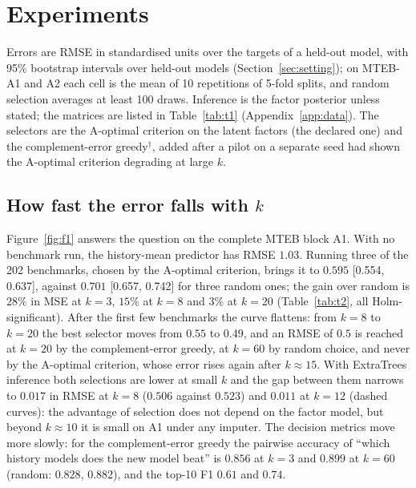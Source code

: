 \section{Experiments}
\label{sec:experiments}
Errors are RMSE in standardised units over the targets of a held-out model, with 95\% bootstrap intervals over held-out models (Section~\ref{sec:setting}); on MTEB-A1 and A2 each cell is the mean of 10 repetitions of 5-fold splits, and random selection averages at least 100 draws.
Inference is the factor posterior unless stated; the matrices are listed in Table~\ref{tab:t1} (Appendix~\ref{app:data}).
The selectors are the A-optimal criterion on the latent factors (the declared one) and the complement-error greedy$^\dagger$, added after a pilot on a separate seed had shown the A-optimal criterion degrading at large $k$.


\subsection{How fast the error falls with $k$}
Figure~\ref{fig:f1} answers the question on the complete MTEB block A1.
With no benchmark run, the history-mean predictor has RMSE $1.03$.
Running three of the 202 benchmarks, chosen by the A-optimal criterion, brings it to $0.595$ [0.554, 0.637], against $0.701$ [0.657, 0.742] for three random ones; the gain over random is $28\%$ in MSE at $k=3$, $15\%$ at $k=8$ and $3\%$ at $k=20$ (Table~\ref{tab:t2}, all Holm-significant).
After the first few benchmarks the curve flattens: from $k=8$ to $k=20$ the best selector moves from $0.55$ to $0.49$, and an RMSE of $0.5$ is reached at $k=20$ by the complement-error greedy, at $k=60$ by random choice, and never by the A-optimal criterion, whose error rises again after $k\approx15$.
With ExtraTrees inference both selections are lower at small $k$ and the gap between them narrows to $0.017$ in RMSE at $k=8$ ($0.506$ against $0.523$) and $0.011$ at $k=12$ (dashed curves): the advantage of selection does not depend on the factor model, but beyond $k\approx10$ it is small on A1 under any imputer.
The decision metrics move more slowly: for the complement-error greedy the pairwise accuracy of ``which history models does the new model beat'' is $0.856$ at $k=3$ and $0.899$ at $k=60$ (random: $0.828$, $0.882$), and the top-10 F1 $0.61$ and $0.74$.

